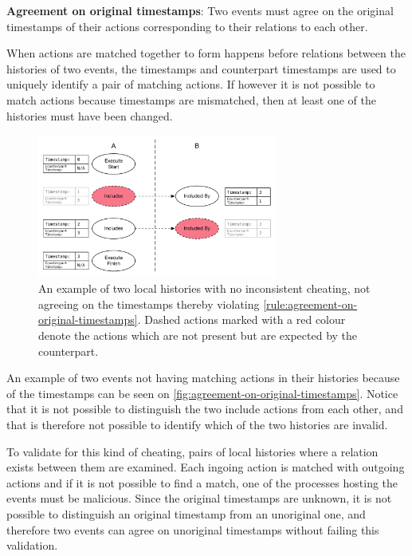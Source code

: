 	\begin{ruledef}
		\textbf{Agreement on original timestamps}: Two events must agree on the original timestamps of their actions corresponding to their relations to each other.
		\label{rule:agreement-on-original-timestamps}
	\end{ruledef}
	
	\noindent When actions are matched together to form happens before relations between the histories of two events, the timestamps and counterpart timestamps are used to uniquely identify a pair of matching actions. If however it is not possible to match actions because timestamps are mismatched, then at least one of the histories must have been changed. 
	
	\begin{figure}[H]
		\centering
		\includegraphics[width=0.7\textwidth]{5validation/images/agreement-on-original-timestamps.pdf}
		\caption{An example of two local histories with no inconsistent cheating, not agreeing on the timestamps thereby violating \autoref{rule:agreement-on-original-timestamps}. Dashed actions marked with a red colour denote the actions which are not present but are expected by the counterpart.}
		\label{fig:agreement-on-original-timestamps}
	\end{figure}
	
	An example of two events not having matching actions in their histories because of the timestamps can be seen on \autoref{fig:agreement-on-original-timestamps}. Notice that it is not possible to distinguish the two include actions from each other, and that is therefore not possible to identify which of the two histories are invalid.
	
	\newpar To validate for this kind of cheating, pairs of local histories where a relation exists between them are examined. Each ingoing action is matched with outgoing actions and if it is not possible to find a match, one of the processes hosting the events must be malicious. Since the original timestamps are unknown, it is not possible to distinguish an original timestamp from an unoriginal one, and therefore two events can agree on unoriginal timestamps without failing this validation.
	
